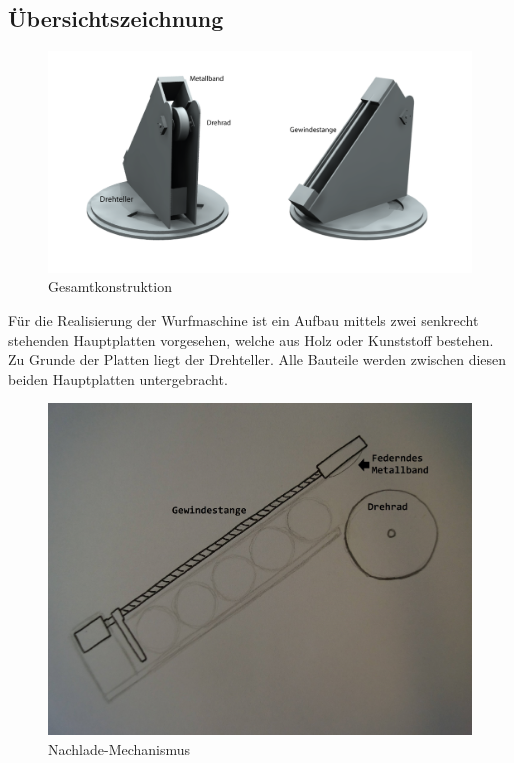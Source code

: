 \subsection{Übersichtszeichnung}

\begin{figure}[h!]
	\centering
	\includegraphics[scale=0.5]{../../fig/StudioLegende.png}
	\caption{Gesamtkonstruktion}
\end{figure}

Für die Realisierung der Wurfmaschine ist ein Aufbau mittels zwei senkrecht stehenden Hauptplatten vorgesehen, welche aus Holz oder Kunststoff bestehen. Zu Grunde der Platten liegt der Drehteller. Alle Bauteile werden zwischen diesen beiden Hauptplatten untergebracht.

\newpage

\begin{figure}[h!]
	\label{fig:nachlade-machanismus}
	\centering
	\includegraphics[scale=0.35]{../../fig/Ballnachlader.jpg}
	\caption{Nachlade-Mechanismus}
\end{figure}

